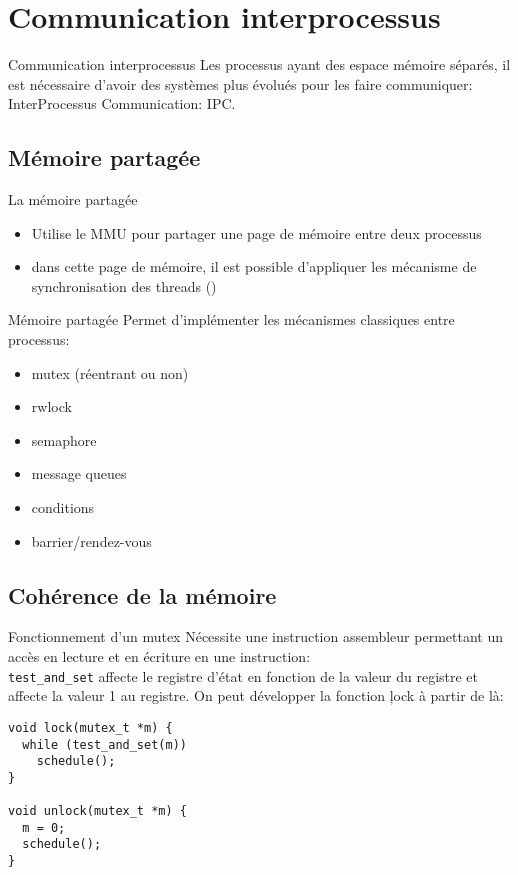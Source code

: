 \section{Communication interprocessus}

\begin{frame}[fragile]{Communication interprocessus}
  Les processus  ayant des espace  mémoire séparés, il  est nécessaire
  d'avoir des systèmes plus évolués pour les faire communiquer:\\
  InterProcessus Communication: IPC.
\end{frame}

\subsection{Mémoire partagée}

\begin{frame}[fragile=singleslide]{La mémoire partagée}
  \begin{itemize}
  \item Utilise  le MMU pour partager  une page de  mémoire entre deux
    processus
  \item dans  cette page de  mémoire, il est possible  d'appliquer les
    mécanisme        de       synchronisation        des       threads
    ()
  \end{itemize}
\end{frame}

\begin{frame}[fragile]{Mémoire partagée}
  Permet d'implémenter les mécanismes classiques entre processus:
  \begin{itemize}
  \item mutex (réentrant ou non)
  \item rwlock
  \item semaphore
  \item message queues
  \item conditions
  \item barrier/rendez-vous
  \end{itemize}
\end{frame}

\subsection{Cohérence de la mémoire}

\begin{frame}[fragile]{Fonctionnement d'un mutex}
  Nécessite une instruction assembleur  permettant un accès en lecture
  et en écriture  en une instruction: \\
  \texttt{test\_and\_set} affecte le registre d'état en fonction de la
  valeur  du registre  et affecte  la valeur  1 au  registre.  On peut
  développer la fonction \c{lock} à partir de là:
  \begin{lstlisting}
void lock(mutex_t *m) {
  while (test_and_set(m))
    schedule();
}

void unlock(mutex_t *m) {
  m = 0;
  schedule();
}
  \end{lstlisting}
\end{frame}

